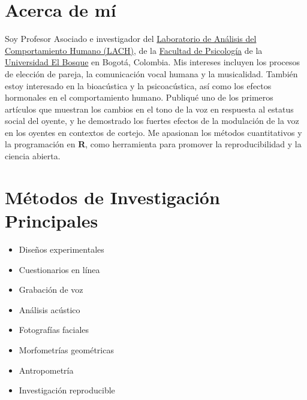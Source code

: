 \documentclass[11pt,a4paper,]{awesome-cv}
\begin{document}
\makecvheader






\hypertarget{acerca-de-muxed}{%
\section{Acerca de mí}\label{acerca-de-muxed}}

Soy Profesor Asociado e investigador del
\href{https://www.psicologia.unbosque.edu.co/lach}{Laboratorio de
Análisis del Comportamiento Humano (LACH)}, de la
\href{https://www.uelbosque.edu.co/psicologia}{Facultad de Psicología}
de la \href{https://www.uelbosque.edu.co/}{Universidad El Bosque} en
Bogotá, Colombia. Mis intereses incluyen los procesos de elección de
pareja, la comunicación vocal humana y la musicalidad. También estoy
interesado en la bioacústica y la psicoacústica, así como los efectos
hormonales en el comportamiento humano. Publiqué uno de los primeros
artículos que muestran los cambios en el tono de la voz en respuesta al
estatus social del oyente, y he demostrado los fuertes efectos de la
modulación de la voz en los oyentes en contextos de cortejo. Me
apasionan los métodos cuantitativos y la programación en \textbf{R},
como herramienta para promover la reproducibilidad y la ciencia abierta.

\hypertarget{muxe9todos-de-investigaciuxf3n-principales}{%
\section{Métodos de Investigación
Principales}\label{muxe9todos-de-investigaciuxf3n-principales}}

\begin{multicols}{2}
\begin{itemize}
 \item Diseños experimentales
 \item Cuestionarios en línea 
 \item Grabación de voz
 \item Análisis acústico
 \item Fotografías faciales
 \item Morfometrías geométricas
 \item Antropometría
 \item Investigación reproducible
\end{itemize}
\end{multicols}
\end{document}
